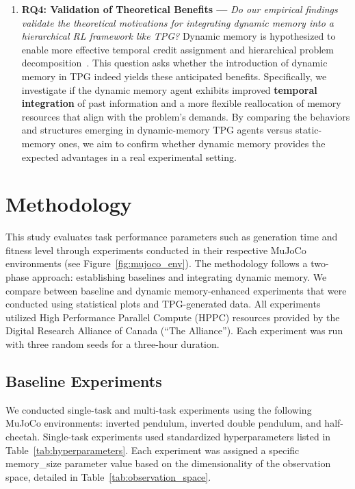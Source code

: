 \documentclass[sigconf]{acmart}
\begin{document}
\begin{enumerate}
    \item \textbf{RQ4: Validation of Theoretical Benefits ---} \textit{Do our empirical findings validate the theoretical motivations for integrating dynamic memory into a hierarchical RL framework like TPG?} Dynamic memory is hypothesized to enable more effective temporal credit assignment and hierarchical problem decomposition~\cite{Kelly21TELO}. This question asks whether the introduction of dynamic memory in TPG indeed yields these anticipated benefits. Specifically, we investigate if the dynamic memory agent exhibits improved \textbf{temporal integration} of past information and a more flexible reallocation of memory resources that align with the problem's demands. By comparing the behaviors and structures emerging in dynamic-memory TPG agents versus static-memory ones, we aim to confirm whether dynamic memory provides the expected advantages in a real experimental setting.
\end{enumerate}

\section{Methodology}
\label{sec:methodology}

This study evaluates task performance parameters such as generation time and 
fitness level through experiments conducted in their respective MuJoCo environments 
(see Figure~\ref{fig:mujoco_env}). The methodology follows a two-phase approach: establishing baselines
and integrating dynamic memory. We compare between baseline and dynamic memory-enhanced
experiments that were conducted using statistical plots and TPG-generated data. All
experiments utilized High Performance Parallel Compute (HPPC) resources provided by the
Digital Research Alliance of Canada (“The Alliance”). Each experiment was run with three
random seeds for a three-hour duration.

\subsection{Baseline Experiments}
We conducted single-task and multi-task experiments using the following MuJoCo environments:
inverted pendulum, inverted double pendulum, and half-cheetah. Single-task experiments used standardized
hyperparameters listed in Table~\ref{tab:hyperparameters}. Each experiment was assigned a specific memory\_size 
parameter value based on the dimensionality of the observation space, detailed in Table~\ref{tab:observation_space}.
\end{document}
